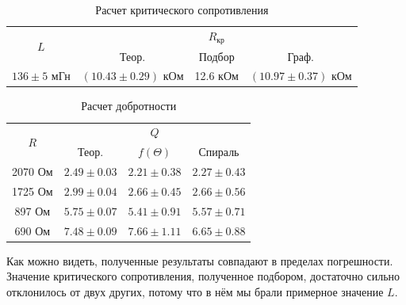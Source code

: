 \documentclass[a4paper,14pt]{article}
\begin{document}
\begin{table}[h!]
	\centering
	\caption{Расчет критического сопротивления}
	\begin{tabular}{|c|c|c|c|}
		\hline
		\multirow{2}{*}{$  L $} & \multicolumn{3}{|c|}{$ R_\text{кр} $} \\
		\cline{2-4}
		& Теор. & Подбор & Граф.  \\
		\hline
		$ 136 \pm  5 $ мГн   & $ (10.43 \pm 0.29) $ кОм & 12.6 кОм & 	$ (10.97 \pm 0.37) $ кОм \\
		\hline
	\end{tabular}
\end{table}

\begin{table}[h!]
	\centering
	\caption{Расчет добротности}
	\begin{tabular}{|c|c|c|c|}
		\hline
		\multirow{2}{*}{$ R $} & \multicolumn{3}{|c|}{$ Q $} \\
		\cline{2-4}
		& Теор. & $ f(\Theta) $ & Спираль \\
		\hline
		2070 Ом & $ 2.49 \pm 0.03 $ & $ 2.21 \pm 0.38 $ & $ 2.27 \pm 0.43 $ \\
		\hline
		1725 Ом  & $ 2.99 \pm 0.04 $ & $ 2.66 \pm 0.45 $  & $ 2.66 \pm 0.56 $ \\
		\hline
		897 Ом  & $ 5.75 \pm 0.07 $ & $ 5.41 \pm 0.91 $  & $ 5.57 \pm 0.71 $ \\
		\hline
		690 Ом  & $ 7.48 \pm 0.09 $ & $ 7.66 \pm 1.11 $  & $ 6.65 \pm 0.88 $ \\
		\hline
	\end{tabular}
\end{table}

Как можно видеть, полученные результаты совпадают в пределах погрешности. Значение критического сопротивления, полученное подбором, достаточно сильно отклонилось от двух других, потому что в нём мы брали примерное значение $L$.
\end{document}
